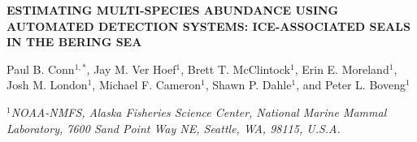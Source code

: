 \documentclass[12pt,fleqn]{article}
\begin{document}
\thispagestyle{empty}

\setlength{\baselineskip}{24pt}




\vspace{2 mm}

\begin{center} \bf {\large ESTIMATING MULTI-SPECIES ABUNDANCE USING AUTOMATED DETECTION SYSTEMS: ICE-ASSOCIATED SEALS IN THE BERING SEA}

\vspace{0.7cm}
Paul B. Conn$^{1,*}$, Jay M. Ver Hoef$^1$, Brett T. McClintock$^1$, Erin E. Moreland$^1$, Josh M. London$^1$, Michael F. Cameron$^1$, Shawn P. Dahle$^1$, and Peter L. Boveng$^1$
\end{center}
\vspace{0.5cm}

\rm
\small

\it $^1$NOAA-NMFS, Alaska Fisheries Science Center, National Marine Mammal Laboratory, 7600 Sand Point Way NE, Seattle, WA, 98115, U.S.A.\\
\end{document}
